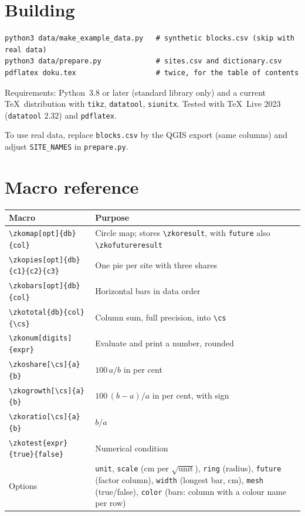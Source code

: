 \documentclass[11pt,a4paper]{article}
\begin{document}
\section{Building}\label{sec:build}

\begin{Verbatim}
python3 data/make_example_data.py   # synthetic blocks.csv (skip with real data)
python3 data/prepare.py             # sites.csv and dictionary.csv
pdflatex doku.tex                   # twice, for the table of contents
\end{Verbatim}

Requirements: Python~3.8 or later (standard library only) and a current \TeX\
distribution with \texttt{tikz}, \texttt{datatool}, \texttt{siunitx}. Tested
with \TeX\ Live 2023 (\texttt{datatool} 2.32) and \texttt{pdflatex}.

To use real data, replace \texttt{blocks.csv} by the QGIS export (same
columns) and adjust \texttt{SITE\_NAMES} in \texttt{prepare.py}.

\appendix
\section{Macro reference}

{\small
\begin{tabularx}{\linewidth}{@{}l X@{}}
\toprule
Macro & Purpose \\
\midrule
\verb|\zkomap[opt]{db}{col}| & Circle map; stores \verb|\zkoresult|,
  with \texttt{future} also \verb|\zkofutureresult| \\
\verb|\zkopies[opt]{db}{c1}{c2}{c3}| & One pie per site with three shares \\
\verb|\zkobars[opt]{db}{col}| & Horizontal bars in data order \\
\verb|\zkototal{db}{col}{\cs}| & Column sum, full precision, into \verb|\cs| \\
\verb|\zkonum[digits]{expr}| & Evaluate and print a number, rounded \\
\verb|\zkoshare[\cs]{a}{b}| & $100\,a/b$ in per cent \\
\verb|\zkogrowth[\cs]{a}{b}| & $100\,(b-a)/a$ in per cent, with sign \\
\verb|\zkoratio[\cs]{a}{b}| & $b/a$ \\
\verb|\zkotest{expr}{true}{false}| & Numerical condition \\
\midrule
Options & \texttt{unit}, \texttt{scale} (cm per $\sqrt{\text{unit}}$),
  \texttt{ring} (radius), \texttt{future} (factor column),
  \texttt{width} (longest bar, cm), \texttt{mesh} (true/false),
  \texttt{color} (bars: column with a colour name per row) \\
\bottomrule
\end{tabularx}}
\end{document}
